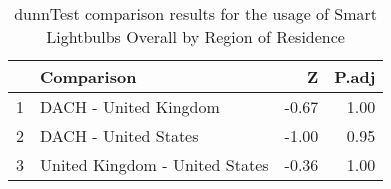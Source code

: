 \begin{table}[ht]
\centering
\begin{tabular}{rlrr}
  \hline
 & Comparison & Z & P.adj \\ 
  \hline
1 & DACH - United Kingdom & -0.67 & 1.00 \\ 
  2 & DACH - United States & -1.00 & 0.95 \\ 
  3 & United Kingdom - United States & -0.36 & 1.00 \\ 
   \hline
\end{tabular}
\caption{dunnTest comparison results for the usage of Smart Lightbulbs Overall by Region of Residence} 
\end{table}
